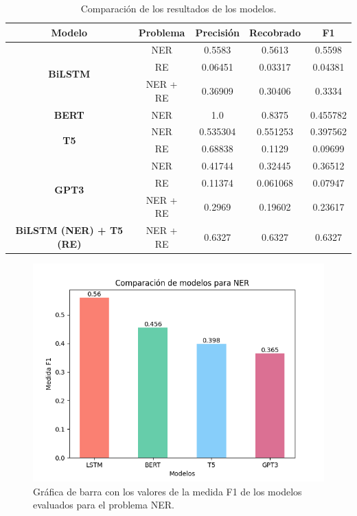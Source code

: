 \documentclass[10pt]{article} %
\begin{document}
	\begin{table}[htb]
		\centering
		\begin{tabular}{|c|c|c|c|c|}
			\hline
			\textbf{Modelo} & \textbf{Problema} & \textbf{Precisi\'on} & \textbf{Recobrado} & \textbf{F1} \\
			\hline
			\multirow{3}{*}{\textbf{BiLSTM}} & NER & 0.5583 & 0.5613 & 0.5598 \\
			\cline{2-5}
			& RE & 0.06451 & 0.03317 & 0.04381 \\
			\cline{2-5}
			& NER + RE & 0.36909 & 0.30406 & 0.3334 \\
			\hline
		\textbf{BERT} & NER & 1.0 & 0.8375 & 0.455782 \\
			\hline
			\multirow{2}{*}{\textbf{T5}} & NER & 0.535304 & 0.551253 & 0.397562 \\
			\cline{2-5}
			& RE & 0.68838 & 0.1129 & 0.09699 \\
			\hline
			\multirow{3}{*}{\textbf{GPT3}} & NER & 0.41744 & 0.32445 & 0.36512 \\
			\cline{2-5}
			& RE & 0.11374 & 0.061068 & 0.07947 \\
			\cline{2-5}
			& NER + RE & 0.2969 & 0.19602 & 0.23617 \\
			\hline
			\textbf{BiLSTM (NER) + T5 (RE)} & NER + RE & 0.6327 & 0.6327 & 0.6327 \\
			\hline
			
		\end{tabular}
		\caption{Comparaci\'on de los resultados de los modelos.}
		\label{resultados}
	\end{table}
	
	
	\begin{figure}[htb]
		\centering
		\includegraphics[scale=0.6]{../images/NER_bar}
		\caption{Gr\'afica de barra con los valores de la medida F1 de los modelos evaluados para el problema NER.}
		\label{NER}
	\end{figure}
\end{document}
